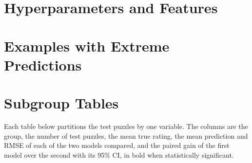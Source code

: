 \documentclass[11pt]{article}
\begin{document}



\clearpage
\appendix

\section{Hyperparameters and Features}

\begin{table}[htbp]\centering\footnotesize
{}
\caption{Hyperparameters of the networks of the fixed sequence, from their
configuration files. \emph{LR} is the peak learning rate. Values shared by
all of them are given below the table.}
\label{tab:settings}
\end{table}

\begin{table}[htbp]\centering\footnotesize
{}
\caption{Hand-crafted features: the inputs of  in addition
to the scalar context features, and of a network whose configuration includes
them.}
\label{tab:hand}
\end{table}

\iflook
\section{Examples with Extreme Predictions}



\section{Subgroup Tables}

Each table below partitions the test puzzles by one variable. The columns are
the group, the number of test puzzles, the mean true rating, the mean
prediction and RMSE of each of the two models compared, and the paired gain
of the first model over the second with its 95\% CI, in bold when
statistically significant.

\fi
\end{document}
